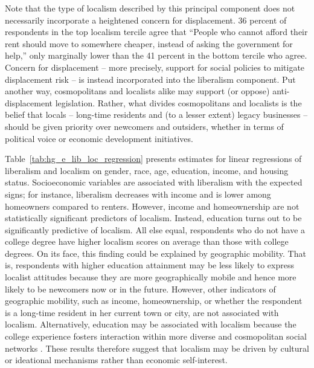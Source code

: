 \documentclass[article,12pt]{memoir}
\begin{document}
Note that the type of localism described by this principal component does not necessarily incorporate a heightened concern for displacement.  36 percent of respondents in the top localism tercile agree that ``People who cannot afford their rent should move to somewhere cheaper, instead of asking the government for help,'' only marginally lower than the 41 percent in the bottom tercile who agree. Concern for displacement -- more precisely, support for social policies to mitigate displacement risk -- is instead incorporated into the liberalism component. Put another way, cosmopolitans and localists alike may support (or oppose) anti-displacement legislation. Rather, what divides cosmopolitans and localists is the belief that locals -- long-time residents and (to a lesser extent) legacy businesses -- should be given priority over newcomers and outsiders, whether in terms of political voice or economic development initiatives.  

Table~\ref{tab:hg_e_lib_loc_regression} presents estimates for linear regressions of liberalism and localism on gender, race, age, education, income, and housing status. Socioeconomic variables are associated with liberalism with the expected signs; for instance, liberalism decreases with income and is lower among homeowners compared to renters. However, income and homeownership are not statistically significant predictors of localism. Instead, education turns out to be significantly predictive of localism. All else equal, respondents who do not have a college degree have higher localism scores on average than those with college degrees.  On its face, this finding could be explained by geographic mobility.  That is, respondents with higher education attainment may be less likely to express localist attitudes because they are more geographically mobile and hence more likely to be newcomers now or in the future.  However, other indicators of geographic mobility, such as income, homeownership, or whether the respondent is a long-time resident in her current town or city, are not associated with localism. Alternatively, education may be associated with localism because the college experience fosters interaction within more diverse and cosmopolitan social networks \citep{case_social_1989,chandler_social_2001-1}. These results therefore suggest that localism may be driven by cultural or ideational mechanisms rather than economic self-interest.

\end{document}
